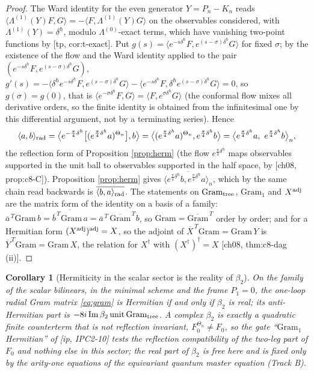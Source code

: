 \documentclass[11pt]{article}
\theoremstyle{plain}
\newtheorem{corollary}[theorem]{Corollary}
\theoremstyle{definition}
\numberwithin{equation}{section}
\newcommand{\TP}[2]{\big\langle #1,#2\big\rangle}
\newcommand{\Gt}{\mathrm{Gram}_{\rm tree}}
\newcommand{\Go}{\mathrm{Gram}_1}
\begin{document}
\begin{proof}
The Ward identity for the even generator $Y=P_n-K_n$ reads $\TP{\Lambda^{(1)}(Y)F}{G}=-\TP{F}{\Lambda^{(1)}(Y)G}$ on the observables considered, with $\Lambda^{(1)}(Y)=\delta^\hbar$, modulo $\Lambda^{(0)}$-exact terms, which have vanishing two-point functions by [tp, cor:t-exact]. Put $g(s)=\TP{e^{-s\delta^\hbar}F}{e^{(s-\sigma)\delta^\hbar}G}$ for fixed $\sigma$; by the existence of the flow and the Ward identity applied to the pair $(e^{-s\delta^\hbar}F,e^{(s-\sigma)\delta^\hbar}G)$, $g'(s)=-\TP{\delta^\hbar e^{-s\delta^\hbar}F}{e^{(s-\sigma)\delta^\hbar}G}-\TP{e^{-s\delta^\hbar}F}{\delta^\hbar e^{(s-\sigma)\delta^\hbar}G}=0$, so $g(\sigma)=g(0)$, that is $\TP{e^{-\sigma\delta^\hbar}F}{G}=\TP{F}{e^{\sigma\delta^\hbar}G}$ (the conformal flow mixes all derivative orders, so the finite identity is obtained from the infinitesimal one by this differential argument, not by a terminating series). Hence
\[
\langle a,b\rangle_{\rm rad}=\TP{e^{-\frac\pi4\delta^\hbar}\big[(e^{\frac\pi4\delta^\hbar}a)^{\Theta_n}\big]}{b}=\TP{(e^{\frac\pi4\delta^\hbar}a)^{\Theta_n}}{e^{\frac\pi4\delta^\hbar}b}=\big\langle e^{\frac\pi4\delta^\hbar}a,\ e^{\frac\pi4\delta^\hbar}b\big\rangle_n ,
\]
the reflection form of Proposition \ref{prop:herm} (the flow $e^{\frac\pi4\delta^\hbar}$ maps observables supported in the unit ball to observables supported in the half space, by [ch08, prop:c8-C]). Proposition \ref{prop:herm} gives $\overline{\langle e^{\frac\pi4\delta^\hbar}b,e^{\frac\pi4\delta^\hbar}a\rangle_n}$, which by the same chain read backwards is $\overline{\langle b,a\rangle_{\rm rad}}$. The statements on $\Gt$, $\Go$ and $X^{\rm adj}$ are the matrix form of the identity on a basis of a family: $\overline{a}^{\,T}\mathrm{Gram}\,b=\overline{\overline{b}^{\,T}\mathrm{Gram}\,a}=\overline{a}^{\,T}\,\overline{\mathrm{Gram}}^{\,T}b$, so $\mathrm{Gram}=\overline{\mathrm{Gram}}^{\,T}$ order by order; and for a Hermitian form $(X^{\rm adj})^{\rm adj}=X$, so the adjoint of $\overline{X}^{\,T}\mathrm{Gram}=\mathrm{Gram}\,Y$ is $\overline{Y}^{\,T}\mathrm{Gram}=\mathrm{Gram}\,X$, the relation for $X^\dagger$ with $(X^\dagger)^\dagger=X$ [ch08, thm:c8-dag (ii)].
\end{proof}

\begin{corollary}[Hermiticity in the scalar sector is the reality of $\beta_2$]
\label{cor:beta2}
On the family of the scalar bilinears, in the minimal scheme and the frame $P_1=0$, the one-loop radial Gram matrix \eqref{eq:gram} is Hermitian if and only if $\beta_2$ is real; its anti-Hermitian part is $-8i\operatorname{Im}\beta_2\,\mathrm{unit}\,\Gt$. A complex $\beta_2$ is exactly a quadratic finite counterterm that is not reflection invariant, $F_0^{\Theta_n}\ne F_0$, so the gate ``$\Go$ Hermitian'' of [ip, IPC2-10] tests the reflection compatibility of the two-leg part of $F_0$ and nothing else in this sector; the real part of $\beta_2$ is free here and is fixed only by the arity-one equations of the equivariant quantum master equation (Track B).
\end{corollary}
\end{document}
